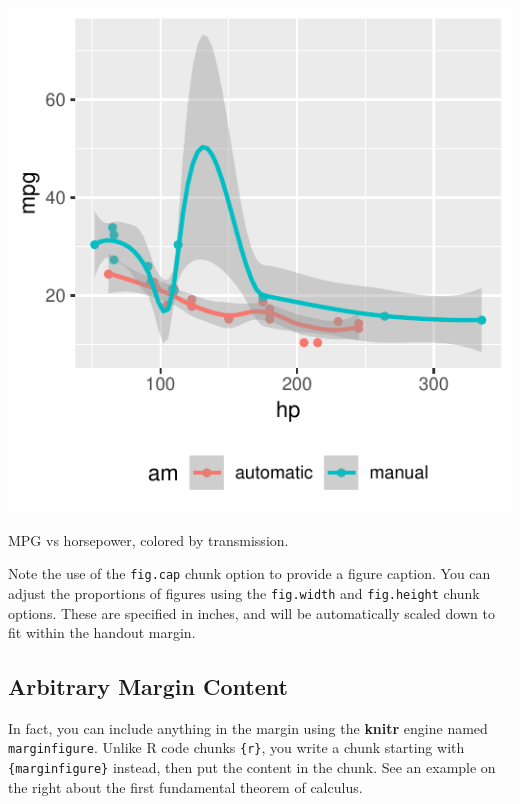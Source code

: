 \documentclass[]{tufte-handout}
\begin{document}
\begin{marginfigure}
\includegraphics{TufteExample_files/figure-latex/fig-margin-1} \caption[MPG vs horsepower, colored by transmission]{MPG vs horsepower, colored by transmission.}\label{fig:fig-margin}
\end{marginfigure}

Note the use of the \texttt{fig.cap} chunk option to provide a figure
caption. You can adjust the proportions of figures using the
\texttt{fig.width} and \texttt{fig.height} chunk options. These are
specified in inches, and will be automatically scaled down to fit within
the handout margin.

\subsection{Arbitrary Margin Content}\label{arbitrary-margin-content}

In fact, you can include anything in the margin using the \textbf{knitr}
engine named \texttt{marginfigure}. Unlike R code chunks
\texttt{\textasciigrave{}\textasciigrave{}\textasciigrave{}\{r\}}, you
write a chunk starting with
\texttt{\textasciigrave{}\textasciigrave{}\textasciigrave{}\{marginfigure\}}
instead, then put the content in the chunk. See an example on the right
about the first fundamental theorem of calculus.
\end{document}
